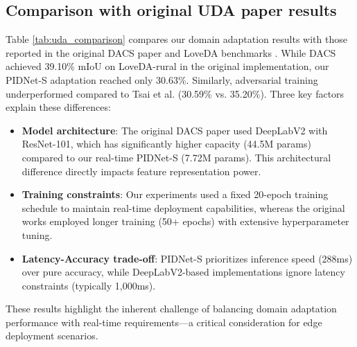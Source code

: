 \documentclass{article}
\begin{document}
\begin{multicols}{2}
\begin{table}[H]
		\end{table}


		\subsection{Comparison with original UDA paper results}
		Table \ref{tab:uda_comparison} compares our domain adaptation results with those reported in the original DACS paper \cite{tranheden2021dacs} and LoveDA benchmarks \cite{loveda2021}. While DACS achieved 39.10\% mIoU on LoveDA-rural in the original implementation, our PIDNet-S adaptation reached only 30.63\%. Similarly, adversarial training underperformed compared to Tsai et al. \cite{tsai2018learning} (30.59\% vs. 35.20\%). Three key factors explain these differences:
		
		\begin{itemize}
			\item \textbf{Model architecture}: The original DACS paper used DeepLabV2 with ResNet-101, which has significantly higher capacity (44.5M params) compared to our real-time PIDNet-S (7.72M params). This architectural difference directly impacts feature representation power.
			\item \textbf{Training constraints}: Our experiments used a fixed 20-epoch training schedule to maintain real-time deployment capabilities, whereas the original works employed longer training (50+ epochs) with extensive hyperparameter tuning.
			\item \textbf{Latency-Accuracy trade-off}: PIDNet-S prioritizes inference speed (288ms) over pure accuracy, while DeepLabV2-based implementations ignore latency constraints (typically 1,000ms).
		\end{itemize}
		
		\justifying
		These results highlight the inherent challenge of balancing domain adaptation performance with real-time requirements—a critical consideration for edge deployment scenarios.
		

		\begin{table}[H]
			\centering
			\renewcommand{\arraystretch}{1.4} %
			\setlength{\tabcolsep}{6pt} %
			
			\caption{Performance comparison with original UDA paper results.}
			\label{tab:uda_comparison}


\end{table}
\end{multicols}
\end{document}
